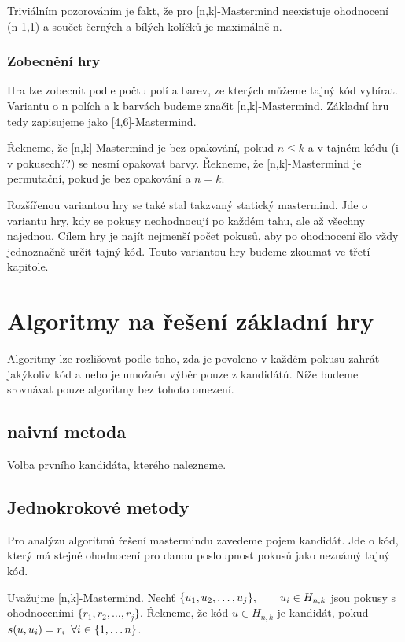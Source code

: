 Triviálním pozorováním je fakt, že pro [n,k]-Mastermind neexistuje ohodnocení (n-1,1) a součet černých a bílých kolíčků je maximálně n. 

\subsubsection{Zobecnění hry}

Hra lze zobecnit podle počtu polí a barev, ze kterých můžeme tajný kód vybírat. Variantu o n polích a k barvách budeme značit [n,k]-Mastermind. Základní hru tedy zapisujeme jako [4,6]-Mastermind. 

Řekneme, že [n,k]-Mastermind je bez opakování, pokud $n \leq k$ a v tajném kódu (i v pokusech??) se nesmí opakovat barvy. Řekneme, že [n,k]-Mastermind je permutační, pokud je bez opakování a $n = k$.

Rozšířenou variantou hry se také stal takzvaný statický mastermind. Jde o variantu hry, kdy se pokusy neohodnocují po každém tahu, ale až všechny najednou. Cílem hry je najít nejmenší počet pokusů, aby po ohodnocení šlo vždy jednoznačně určit tajný kód. Touto variantou hry budeme zkoumat ve třetí kapitole. 


\section{Algoritmy na řešení základní hry}
Algoritmy lze rozlišovat podle toho, zda je povoleno v každém pokusu zahrát jakýkoliv kód a nebo je umožněn výběr pouze z kandidátů. Níže budeme srovnávat pouze algoritmy bez tohoto omezení.


\subsection{naivní metoda}
Volba prvního kandidáta, kterého nalezneme.


\subsection{Jednokrokové metody}

Pro analýzu algoritmů řešení mastermindu zavedeme pojem kandidát. Jde o kód, který má stejné ohodnocení pro danou posloupnost pokusů jako neznámý tajný kód. 
\begin{definice}[kandidát]\label{def01:2}
  Uvažujme [n,k]-Mastermind. Nechť $\{u_1, u_2, \dots, u_j\}, \hspace{20px} u_i \in H_{n,k}$ jsou pokusy s ohodnoceními $\{r_1, r_2, \dots, r_j\}$. Řekneme, že kód $u \in H_{n,k}$ je kandidát, pokud $s(u,u_i) = r_i \hspace{5px} \forall i \in \{1, \dots n\}$. 
\end{definice}

